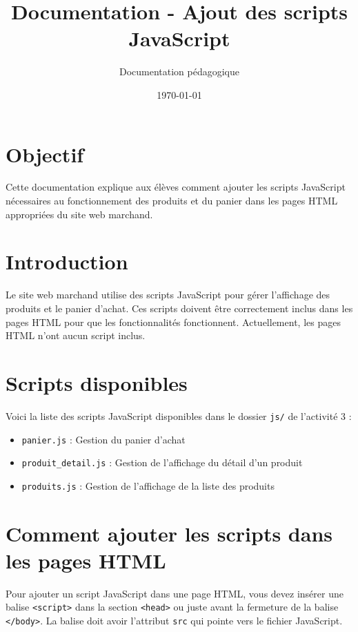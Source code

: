 \documentclass[11pt]{article}
\title{Documentation - Ajout des scripts JavaScript}
\author{Documentation pédagogique}
\date{\today}
\begin{document}
\maketitle

\tableofcontents

\newpage

\section{Objectif}

Cette documentation explique aux élèves comment ajouter les scripts JavaScript nécessaires au fonctionnement des produits et du panier dans les pages HTML appropriées du site web marchand.

\section{Introduction}

Le site web marchand utilise des scripts JavaScript pour gérer l'affichage des produits et le panier d'achat. Ces scripts doivent être correctement inclus dans les pages HTML pour que les fonctionnalités fonctionnent. Actuellement, les pages HTML n'ont aucun script inclus.

\section{Scripts disponibles}

Voici la liste des scripts JavaScript disponibles dans le dossier \texttt{js/} de l'activité 3 :

\begin{itemize}
\item \texttt{panier.js} : Gestion du panier d'achat
\item \texttt{produit\_detail.js} : Gestion de l'affichage du détail d'un produit
\item \texttt{produits.js} : Gestion de l'affichage de la liste des produits
\end{itemize}

\section{Comment ajouter les scripts dans les pages HTML}

Pour ajouter un script JavaScript dans une page HTML, vous devez insérer une balise \texttt{<script>} dans la section \texttt{<head>} ou juste avant la fermeture de la balise \texttt{</body>}. La balise doit avoir l'attribut \texttt{src} qui pointe vers le fichier JavaScript.
\end{document}
